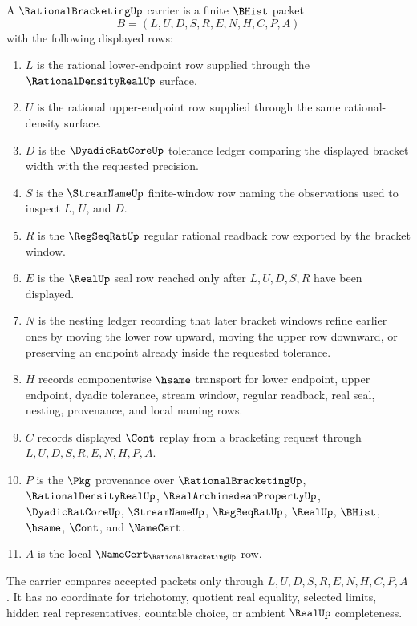 \begin{definition}
\label{def:rational-bracketing-carrier}
A $\RationalBracketingUp$ carrier is a finite $\BHist$ packet
$$
B=(L,U,D,S,R,E,N,H,C,P,A)
$$
with the following displayed rows:
\begin{enumerate}
\item $L$ is the rational lower-endpoint row supplied through the $\RationalDensityRealUp$ surface.
\item $U$ is the rational upper-endpoint row supplied through the same rational-density surface.
\item $D$ is the $\DyadicRatCoreUp$ tolerance ledger comparing the displayed bracket width with the requested precision.
\item $S$ is the $\StreamNameUp$ finite-window row naming the observations used to inspect $L$, $U$, and $D$.
\item $R$ is the $\RegSeqRatUp$ regular rational readback row exported by the bracket window.
\item $E$ is the $\RealUp$ seal row reached only after $L,U,D,S,R$ have been displayed.
\item $N$ is the nesting ledger recording that later bracket windows refine earlier ones by moving the lower row upward, moving the upper row downward, or preserving an endpoint already inside the requested tolerance.
\item $H$ records componentwise $\hsame$ transport for lower endpoint, upper endpoint, dyadic tolerance, stream window, regular readback, real seal, nesting, provenance, and local naming rows.
\item $C$ records displayed $\Cont$ replay from a bracketing request through $L,U,D,S,R,E,N,H,P,A$.
\item $P$ is the $\Pkg$ provenance over $\RationalBracketingUp$, $\RationalDensityRealUp$, $\RealArchimedeanPropertyUp$, $\DyadicRatCoreUp$, $\StreamNameUp$, $\RegSeqRatUp$, $\RealUp$, $\BHist$, $\hsame$, $\Cont$, and $\NameCert$.
\item $A$ is the local $\NameCert_{\RationalBracketingUp}$ row.
\end{enumerate}
The carrier compares accepted packets only through $L,U,D,S,R,E,N,H,C,P,A$. It has no coordinate for trichotomy, quotient real equality, selected limits, hidden real representatives, countable choice, or ambient $\RealUp$ completeness.
\end{definition}

